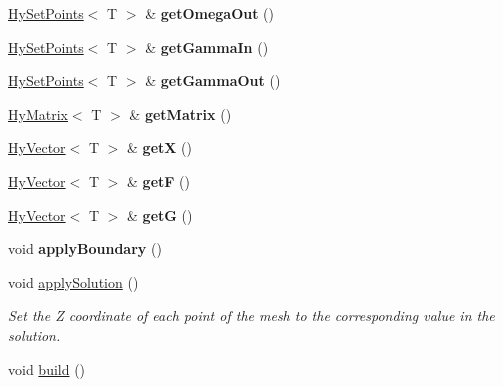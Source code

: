 \begin{DoxyCompactItemize}
\item 
\hypertarget{classHyProblem2D_a9a9b10bfb207c678a75586a7d5f8acf0}{
\hyperlink{classHySetPoints}{HySetPoints}$<$ T $>$ \& {\bfseries getOmegaOut} ()}
\label{classHyProblem2D_a9a9b10bfb207c678a75586a7d5f8acf0}

\item 
\hypertarget{classHyProblem2D_ae7daa17f2a4ca57cf61acaa4c2c41a3a}{
\hyperlink{classHySetPoints}{HySetPoints}$<$ T $>$ \& {\bfseries getGammaIn} ()}
\label{classHyProblem2D_ae7daa17f2a4ca57cf61acaa4c2c41a3a}

\item 
\hypertarget{classHyProblem2D_aead003139eb289fdf4e4ce1bf6aba2e9}{
\hyperlink{classHySetPoints}{HySetPoints}$<$ T $>$ \& {\bfseries getGammaOut} ()}
\label{classHyProblem2D_aead003139eb289fdf4e4ce1bf6aba2e9}

\item 
\hypertarget{classHyProblem2D_a4153c020012fb9bccc2dee03c9047dd0}{
\hyperlink{classHyMatrix}{HyMatrix}$<$ T $>$ \& {\bfseries getMatrix} ()}
\label{classHyProblem2D_a4153c020012fb9bccc2dee03c9047dd0}

\item 
\hypertarget{classHyProblem2D_a40856d8fe948987400d0e2884fef2e14}{
\hyperlink{classHyVector}{HyVector}$<$ T $>$ \& {\bfseries getX} ()}
\label{classHyProblem2D_a40856d8fe948987400d0e2884fef2e14}

\item 
\hypertarget{classHyProblem2D_aa060a4f6d1e4c050dc3c46dd12d26eae}{
\hyperlink{classHyVector}{HyVector}$<$ T $>$ \& {\bfseries getF} ()}
\label{classHyProblem2D_aa060a4f6d1e4c050dc3c46dd12d26eae}

\item 
\hypertarget{classHyProblem2D_a1e6b6d26e0f161092bf1762f31d06054}{
\hyperlink{classHyVector}{HyVector}$<$ T $>$ \& {\bfseries getG} ()}
\label{classHyProblem2D_a1e6b6d26e0f161092bf1762f31d06054}

\item 
\hypertarget{classHyProblem2D_a86e8d77a1d0050784b29e0865a18cbc0}{
void {\bfseries applyBoundary} ()}
\label{classHyProblem2D_a86e8d77a1d0050784b29e0865a18cbc0}

\item 
\hypertarget{classHyProblem2D_ae33f9f4c438dce2e6ecfd5946a3cb2a0}{
void \hyperlink{classHyProblem2D_ae33f9f4c438dce2e6ecfd5946a3cb2a0}{applySolution} ()}
\label{classHyProblem2D_ae33f9f4c438dce2e6ecfd5946a3cb2a0}

\begin{DoxyCompactList}\small\item\em Set the Z coordinate of each point of the mesh to the corresponding value in the solution. \item\end{DoxyCompactList}\item 
\hypertarget{classHyProblem2D_a8cea7c089cabc5321631f97277dc0c68}{
void \hyperlink{classHyProblem2D_a8cea7c089cabc5321631f97277dc0c68}{build} ()}
\label{classHyProblem2D_a8cea7c089cabc5321631f97277dc0c68}


\end{DoxyCompactItemize}
